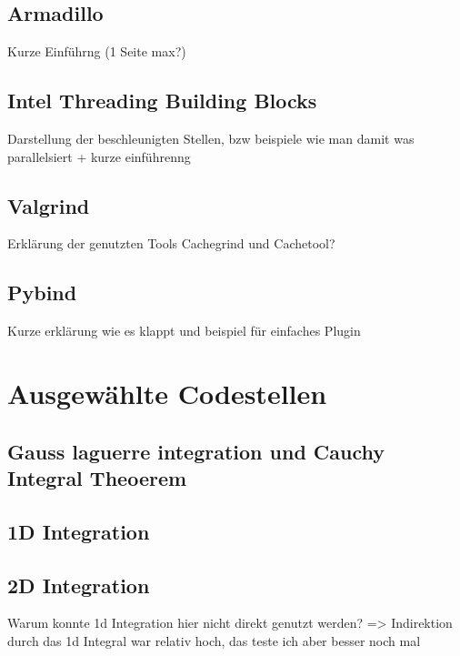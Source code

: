 \subsection{Armadillo}

Kurze Einführng (1 Seite max?)

\subsection{Intel Threading Building Blocks}

Darstellung der beschleunigten Stellen, bzw beispiele wie man damit was parallelsiert + kurze einführenng

\subsection{Valgrind}

Erklärung der genutzten Tools Cachegrind und Cachetool?

\subsection{Pybind}

Kurze erklärung wie es klappt und beispiel für einfaches Plugin


\section{Ausgewählte Codestellen}

\subsection{Gauss laguerre integration und Cauchy Integral Theoerem}



\subsection{1D Integration}



\subsection{2D Integration}

Warum konnte 1d Integration hier nicht direkt genutzt werden?
=> Indirektion durch das 1d Integral war relativ hoch, das teste ich aber besser noch mal